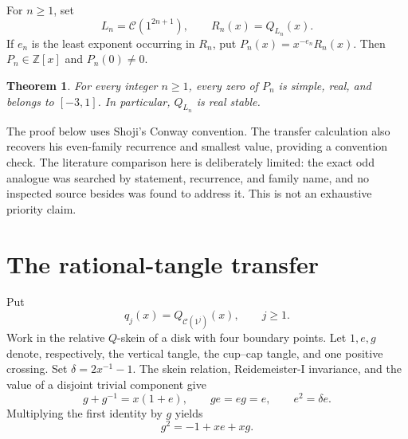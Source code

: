 \documentclass[11pt]{article}
\newtheorem{theorem}{Theorem}
\newcommand{\Z}{\mathbb Z}
\begin{document}
For $n\geq1$, set
\[
 L_n=\mathcal C(1^{2n+1}),\qquad R_n(x)=Q_{L_n}(x).
\]
If $e_n$ is the least exponent occurring in $R_n$, put
$P_n(x)=x^{-e_n}R_n(x)$.  Then $P_n\in\Z[x]$ and $P_n(0)\ne0$.

\begin{theorem}\label{thm:main}
For every integer $n\geq1$, every zero of $P_n$ is simple, real, and belongs
to $[-3,1]$.  In particular, $Q_{L_n}$ is real stable.
\end{theorem}

The proof below uses Shoji's Conway convention.  The transfer calculation
also recovers his even-family recurrence and smallest value, providing a
convention check.  The literature comparison here is deliberately limited:
the exact odd analogue was searched by statement, recurrence, and family
name, and no inspected source besides \cite{Shoji2026} was found to address
it.  This is not an exhaustive priority claim.

\section{The rational-tangle transfer}

Put
\[
 q_j(x)=Q_{\mathcal C(1^j)}(x),\qquad j\geq1.
\]
Work in the relative $Q$-skein of a disk with four boundary points.  Let
$1,e,g$ denote, respectively, the vertical tangle, the cup--cap tangle, and
one positive crossing.  Set $\delta=2x^{-1}-1$.  The skein relation,
Reidemeister-I invariance, and the value of a disjoint trivial component give
\begin{equation}\label{eq:relative}
 g+g^{-1}=x(1+e),\qquad ge=eg=e,\qquad e^2=\delta e.
\end{equation}
Multiplying the first identity by $g$ yields
\begin{equation}\label{eq:g2}
 g^2=-1+xe+xg.
\end{equation}
\end{document}
